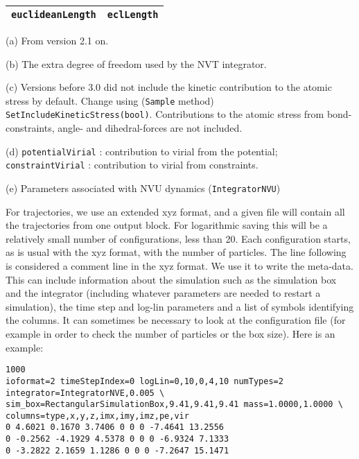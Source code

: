 \documentclass[a4paper]{article}
\begin{document}
\begin{table}
\begin{center}
\begin{threeparttable}
\begin{tabular}{|c|c|}
        \verb|euclideanLength| \tnote{(e)} & \verb|eclLength| \\
        \hline
      \end{tabular}
      \begin{tablenotes}
      \item[(a)] From version 2.1 on.
      \item[(b)] The extra degree of freedom used by the NVT integrator.
      \item[(c)] Versions before 3.0 did not include the kinetic contribution to the atomic stress by default. Change using (\verb|Sample| method) \verb|SetIncludeKineticStress(bool)|. Contributions to the atomic stress from bond-constraints, angle- and dihedral-forces are not included.
      \item[(d)]\verb|potentialVirial| : contribution to virial from the potential; \verb|constraintVirial| : contribution to virial from constraints.
      \item[(e)] Parameters associated with NVU dynamics (\verb|IntegratorNVU|)
      \end{tablenotes}
    \end{threeparttable}
    
    \end{center}
  \end{table}




For trajectories, we use an extended xyz format, and
a given file will contain all the trajectories from one 
output block. For logarithmic saving this will be a relatively small number of
configurations, less than 20. Each configuration starts, as is usual with the
xyz format, with the number of particles. The line following is considered a
comment line in the xyz format. We use it to write the meta-data. This can
include
information about the simulation such as the simulation box and the integrator
(including whatever parameters are needed to restart a simulation),
the time step and log-lin parameters and a list of symbols identifying the
columns. It can sometimes be necessary to look at the configuration file
(for example in order to check the number of particles or the box size).
Here is an example:

\begin{verbatim}
1000
ioformat=2 timeStepIndex=0 logLin=0,10,0,4,10 numTypes=2 integrator=IntegratorNVE,0.005 \
sim_box=RectangularSimulationBox,9.41,9.41,9.41 mass=1.0000,1.0000 \
columns=type,x,y,z,imx,imy,imz,pe,vir
0 4.6021 0.1670 3.7406 0 0 0 -7.4641 13.2556
0 -0.2562 -4.1929 4.5378 0 0 0 -6.9324 7.1333
0 -3.2822 2.1659 1.1286 0 0 0 -7.2647 15.1471
\end{verbatim}
\end{document}
